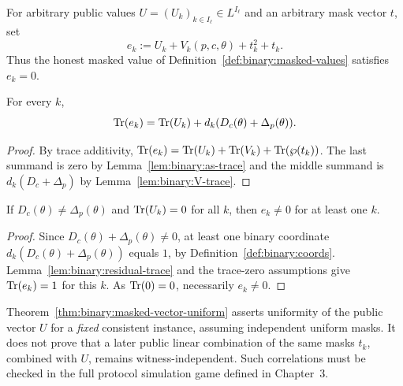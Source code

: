 \begin{definition}\label{def:binary:residual}
For arbitrary public values $U=(U_k)_{k\in I_\ell}\in L^{I_\ell}$
and an arbitrary mask vector $t$, set
\[
 e_k:=U_k+V_k(p,c,\theta)+t_k^2+t_k.
\]
Thus the honest masked value of Definition~\ref{def:binary:masked-values}
satisfies $e_k=0$.
\end{definition}

\begin{lemma}\label{lem:binary:residual-trace}
For every $k$,
\[
 \operatorname{Tr}(e_k)=\operatorname{Tr}(U_k)+d_k(D_c(\theta)+\Delta_p(\theta)).
\]
\end{lemma}
\begin{proof}
By trace additivity,
$\operatorname{Tr}(e_k)=\operatorname{Tr}(U_k)+\operatorname{Tr}(V_k)+\operatorname{Tr}(\wp(t_k))$.
The last summand is zero by Lemma~\ref{lem:binary:as-trace}
and the middle summand is
$d_k(D_c+\Delta_p)$ by
Lemma~\ref{lem:binary:V-trace}.
\end{proof}

\begin{lemma}\label{lem:binary:forced-residual}
If $D_c(\theta)\neq\Delta_p(\theta)$ and
$\operatorname{Tr}(U_k)=0$ for all $k$, then
$e_k\neq0$ for at least one $k$.
\end{lemma}
\begin{proof}
Since $D_c(\theta)+\Delta_p(\theta)\neq0$,
at least one binary coordinate
$d_k(D_c(\theta)+\Delta_p(\theta))$ equals $1$,
by Definition~\ref{def:binary:coords}.
Lemma~\ref{lem:binary:residual-trace} and the
trace-zero assumptions give $\operatorname{Tr}(e_k)=1$ for
this $k$. As $\operatorname{Tr}(0)=0$, necessarily $e_k\neq0$.
\end{proof}

\begin{remark}
Theorem~\ref{thm:binary:masked-vector-uniform}
asserts uniformity of the public vector $U$ for
a \emph{fixed} consistent instance, assuming
independent uniform masks. It does not prove
that a later public linear combination of the
same masks $t_k$, combined with $U$, remains
witness-independent. Such correlations must
be checked in the full protocol simulation game
defined in Chapter~3.
\end{remark}

